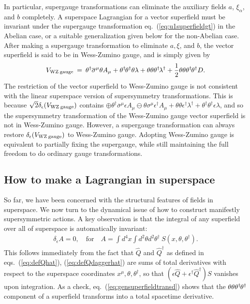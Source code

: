 \documentclass[12pt]{article}
\def\BDneg{-}
\def\BDplus{+}
\def\thetasigmamuthetadagger{\theta\sigma^\mu\theta^\dagger}
\def\BDneg{}
\def\BDplus{-}
\def\thetasigmamuthetadagger{\theta^\dagger\sigmabar^\mu\theta}
\def\BDneg{\ominus}
\def\BDplus{\oplus}
\def\thetasigmamuthetadagger{\theta\sigma^\mu\theta^\dagger}
\def\BDneg{\oplus}
\def\BDplus{\ominus}
\def\thetasigmamuthetadagger{\theta^\dagger\sigmabar^\mu\theta}
\newcommand{\thdthd}{\theta^\dagger\hspace{-1pt}\theta^\dagger}
\def\beq{\begin{eqnarray}}
\def\eeq{\end{eqnarray}}
\def\sigmabar{\overline\sigma}
\begin{document}
In particular, supergauge transformations can eliminate
the auxiliary fields $a$, $\xi_\alpha$,
and $b$ completely.
A superspace Lagrangian for a vector superfield
must be invariant under the 
supergauge transformation
eq.~(\ref{eq:u1superfieldgt}) in the Abelian case, or a 
suitable generalization given below for the non-Abelian case. After making a 
supergauge transformation to eliminate $a,\xi$, and $b$, 
the vector superfield is said to be in 
Wess-Zumino gauge, and is simply given by
\beq
V_{{\rm WZ}\>{\rm gauge}} \>=\> 
\thetasigmamuthetadagger  A_\mu 
+ \thdthd \theta \lambda 
+ \theta \theta  \theta^\dagger\hspace{-1pt} \lambda^\dagger  
+ \frac{1}{2} \theta\theta\thdthd D.
\label{eq:WZgauge}
\eeq
The restriction of the vector superfield to Wess-Zumino gauge 
is not consistent with the linear superspace version of supersymmetry 
transformations. This is because 
$\sqrt{2} \delta_{\epsilon} (V_{{\rm WZ}\>{\rm gauge}})$ 
contains 
$\BDneg \theta^\dagger \sigmabar^\mu \epsilon A_\mu \BDplus \theta \sigma^\mu \epsilon^\dagger A_\mu
+ \theta\theta \epsilon^\dagger \lambda^\dagger +
\theta^\dagger\theta^\dagger \epsilon \lambda$, 
and so the supersymmetry transformation of the Wess-Zumino gauge
vector superfield is not in Wess-Zumino gauge.
However, a supergauge transformation can always restore
$\delta_{\epsilon} (V_{{\rm WZ}\>{\rm gauge}})$ to Wess-Zumino gauge.
Adopting Wess-Zumino gauge is equivalent to partially fixing 
the supergauge, while still maintaining the full freedom 
to do ordinary gauge transformations.

\subsection{How to make a Lagrangian in superspace\label{superspacelagr}}
\setcounter{equation}{0}
\setcounter{footnote}{2}

So far, we have been concerned with the structural features of fields in 
superspace. We now turn to the dynamical issue of how to construct 
manifestly supersymmetric actions. A key observation is that the integral 
of any superfield over all of superspace is automatically 
invariant:
\beq
\delta_\epsilon A = 0,\quad\mbox{for}\quad
A = \int d^4x \int d^2\theta d^2 \theta^\dagger \> S(x, \theta, \theta^\dagger). 
\label{eq:defsuperspaceaction}
\eeq
This follows immediately from the fact that $\hat Q$ and $\hat Q^\dagger$ 
as defined in eqs.~(\ref{eq:defQhat}), (\ref{eq:defQdaggerhat}) are sums 
of total derivatives with respect to the superspace coordinates 
$x^\mu,\theta,\theta^\dagger$, so that $(\epsilon \hat Q + 
\epsilon^\dagger \hat Q^\dagger)S$ vanishes upon integration. As a check, 
eq.~(\ref{eq:gensuperfieldtransd}) shows that the 
$\theta\theta\thdthd$ component of a 
superfield transforms into a total spacetime derivative.
\end{document}
